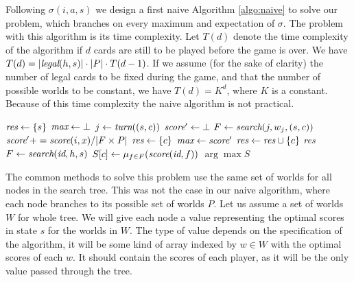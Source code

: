 \documentclass[runningheads]{llncs}
\begin{document}
Following $\sigma(i,a,s)$ %
we design a first naive Algorithm \ref{algo:naive} to solve our problem, which branches on every maximum and expectation of $\sigma$.  
The problem with this algorithm is its time complexity. Let $T(d)$ denote the time complexity of the algorithm if $d$ cards are still to be played before the game is over. We have 
$T(d) = |\mbox{\em legal}(h,s)| \cdot |P| \cdot T(d-1)$.
If we assume (for the sake of clarity) the number of legal cards to be fixed during the game, and that the number of possible worlds to be constant, we have $T(d) = K^d$, where $K$ is a constant. Because of this time complexity the naive algorithm is not practical. 
%
\begin{algorithm}[t]
\caption{$\mbox{\em naive}$}
\label{algo:naive}
\begin{algorithmic}
    \State $\mbox{\em res} \gets \{s\}$
    \State $\mbox{\em max} \gets \bot$
        \State $j \gets \mbox{\em turn}((s,c))$
        \State $\mbox{\em score}' \gets \bot$
            \State $F \gets \mbox{\em search}(j, w_j, (s,c))$
                \State $\mbox{\em score}' += \mbox{\em score}(i,x) / |F \times P|$
            \EndFor
        \EndFor
        	\State $\mbox{\em res} \gets \{ c \}$
        	\State $\mbox{\em max} \gets \mbox{\em score}'$
        	\State $\mbox{\em res} \gets \mbox{\em res} \cup \{c\}$
        \EndIf
    \EndFor
    \State \Return \mbox{\em res}
\EndFunction
\\
        \State $F \gets \mbox{\em search}(\mbox{\em id}, h, s)$
        \State $S[c] \gets \mu_{f \in F}(\mbox{\em score}(\mbox{\em id}, f))$
    \EndFor
    \State \Return $\arg \max S$
\EndFunction
        
\end{algorithmic}
\end{algorithm}
%
The common methods to solve this problem use the same set of worlds for all nodes in the search tree. This was not the case in our naive algorithm, where each node branches to its possible set of worlds $P$. Let us assume a set of worlds $W$ for whole tree. We will give each node a value representing the optimal scores in state $s$ for the worlds in $W$. The type of value depends on the specification of the algorithm, it will be some kind of array indexed by $w \in W$ with the optimal scores of each $w$. It should contain the scores of each player, as it will be the only value passed through the tree.
\end{document}
